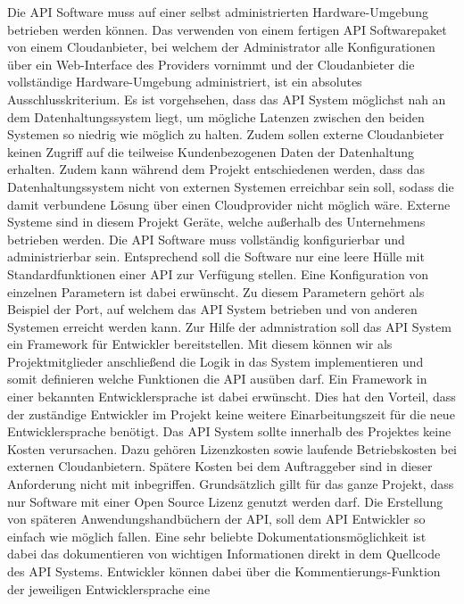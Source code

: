 \begin{outline}
  \1 Die API Software muss auf einer selbst administrierten Hardware-Umgebung
  betrieben werden können. Das verwenden von einem fertigen API Softwarepaket
  von einem Cloudanbieter, bei welchem der Administrator alle Konfigurationen
  über ein Web-Interface des Providers vornimmt und der Cloudanbieter die
  vollständige Hardware-Umgebung administriert, ist ein absolutes
  Ausschlusskriterium. Es ist vorgehsehen, dass das API System möglichst nah an
  dem Datenhaltungssystem liegt, um mögliche Latenzen zwischen den beiden
  Systemen so niedrig wie möglich zu halten. Zudem sollen externe Cloudanbieter
  keinen Zugriff auf die teilweise Kundenbezogenen Daten der Datenhaltung
  erhalten. Zudem kann während dem Projekt entschiedenen werden, dass das
  Datenhaltungssystem nicht von externen Systemen erreichbar sein soll, sodass
  die damit verbundene Lösung über einen Cloudprovider nicht möglich wäre.
  Externe Systeme sind in diesem Projekt Geräte, welche außerhalb des
  Unternehmens betrieben werden.
  \1 Die API Software muss vollständig konfigurierbar und administrierbar sein.
  Entsprechend soll die Software nur eine leere Hülle mit Standardfunktionen
  einer API zur Verfügung stellen. Eine Konfiguration von einzelnen Parametern
  ist dabei erwünscht. Zu diesem Parametern gehört als Beispiel der Port, auf
  welchem das API System betrieben und von anderen Systemen erreicht werden
  kann. Zur Hilfe der admnistration soll das API System ein Framework für
  Entwickler bereitstellen. Mit diesem können wir als Projektmitglieder
  anschließend die Logik in das System implementieren und somit definieren
  welche Funktionen die API ausüben darf. Ein Framework in einer bekannten
  Entwicklersprache ist dabei erwünscht. Dies hat den Vorteil, dass der
  zuständige Entwickler im Projekt keine weitere Einarbeitungszeit für die neue
  Entwicklersprache benötigt.
  \1 Das API System sollte innerhalb des Projektes keine Kosten verursachen.
  Dazu gehören Lizenzkosten sowie laufende Betriebskosten bei externen
  Cloudanbietern. Spätere Kosten bei dem Auftraggeber sind in dieser
  Anforderung nicht mit inbegriffen. Grundsätzlich gillt für das ganze Projekt,
  dass nur Software mit einer Open Source Lizenz genutzt werden darf.
  \1 Die Erstellung von späteren Anwendungshandbüchern der API, soll dem API
  Entwickler so einfach wie möglich fallen. Eine sehr beliebte
  Dokumentationsmöglichkeit ist dabei das dokumentieren von wichtigen
  Informationen direkt in dem Quellcode des API Systems. Entwickler können
  dabei über die Kommentierungs-Funktion der jeweiligen Entwicklersprache eine

\end{outline}
